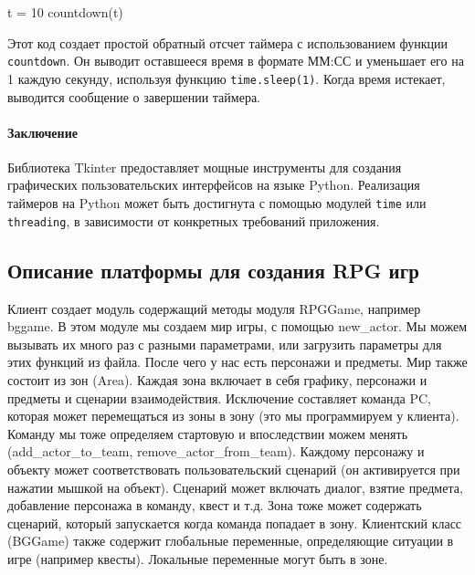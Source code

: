 	t = 10
	countdown(t)
	
Этот код создает простой обратный отсчет таймера с использованием функции \texttt{countdown}. Он выводит оставшееся время в формате ММ:СС и уменьшает его на 1 каждую секунду, используя функцию \texttt{time.sleep(1)}. Когда время истекает, выводится сообщение о завершении таймера.
	
\paragraph{Заключение}
Библиотека Tkinter предоставляет мощные инструменты для создания графических пользовательских интерфейсов на языке Python. Реализация таймеров на Python может быть достигнута с помощью модулей \texttt{time} или \texttt{threading}, в зависимости от конкретных требований приложения.

\subsection{Описание платформы для создания RPG игр}
Клиент создает модуль содержащий методы модуля RPGGame, например bggame. В этом модуле мы создаем мир игры, с помощью new\_actor. Мы можем вызывать их много раз с разными параметрами, или загрузить параметры для этих функций из файла. После чего у нас есть персонажи и предметы. Мир также состоит из зон (Area). Каждая зона включает в себя графику, персонажи и предметы и сценарии взаимодействия. Исключение составляет команда PC, которая может перемещаться из зоны в зону (это мы программируем у клиента). Команду мы тоже определяем стартовую и впоследствии можем менять (add\_actor\_to\_team, remove\_actor\_from\_team). Каждому персонажу и объекту может соответствовать пользовательский сценарий (он активируется при нажатии мышкой на объект). Сценарий может включать диалог, взятие предмета, добавление персонажа в команду, квест и т.д.
Зона тоже может содержать сценарий, который запускается когда команда попадает в зону.
Клиентский класс (BGGame) также содержит глобальные переменные, определяющие ситуации в игре (например квесты). Локальные переменные могут быть в зоне.

